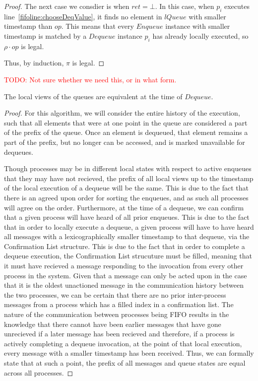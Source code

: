 \documentclass[a4paper,anonymous,USenglish]{lipics-v2021} %
\theoremstyle{definition}
\newcommand{\red}[1]{\textcolor{red}{#1}} %
\begin{document}
\begin{proof}
  The next case we consdier is when $ret = \bot$.  In this case, when $p_i$ executes line~\ref{fifoline:chooseDeqValue}, it finds no element in $lQueue$ with smaller timestamp than $op$.  This means that every $Enqueue$ instance with smaller timestamp is matched by a $Dequeue$ instance $p_i$ has already locally executed, so $\rho \cdot op$ is legal.

  Thus, by induction, $\pi$ is legal.
\end{proof}


\red{TODO: Not sure whether we need this, or in what form.}
\begin{lemma}
  The local views of the queues are equivalent at the time of $Dequeue$.
\end{lemma}

\begin{proof}
  For this algorithm, we will consider the entire history of the execution, such that all elements that were at one point in the queue are considered a part of the prefix of the queue. Once an element is dequeued, that element remains a part of the prefix, but no longer can be accessed, and is marked unavailable for dequeues.
  
Though processes may be in different local states with respect to active enqueues that they may have not recieved, the prefix of all local views up to the timestamp of the local execution of a dequeue will be the same. This is due to the fact that there is an agreed upon order for sorting the enqueues, and as such all processes will agree on the order. Furthermore, at the time of a dequeue, we can confirm that a given process will have heard of all prior enqueues. This is due to the fact that in order to locally execute a dequeue, a given process will have to have heard all messages with a lexicographically smaller timestamp to that dequeue, via the Confirmation List structure. This is due to the fact that in order to complete a dequeue execution, the Confirmation List strucuture must be filled, meaning that it must have recieved a message responding to the invocation from every other process in the system. Given that a message can only be acted upon in the case that it is the oldest unactioned message in the communication history between the two processes, we can be certain that there are no prior inter-process messages from a process which has a filled index in a confirmation list. The nature of the communication between processes being FIFO results in the knowledge that there cannot have been earlier messages that have gone unrecieved if a later message has been recieved and therefore, if a process is actively completing a dequeue invocation, at the point of that local execution, every message with a smaller timestamp has been received. Thus, we can formally state that at such a point, the prefix of all messages and queue states are equal across all processes.
\end{proof}
\end{document}
